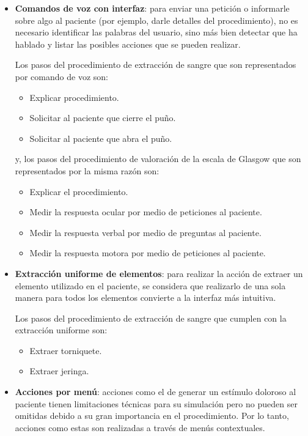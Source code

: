 \begin{itemize}
\item 
    \textbf{Comandos de voz con interfaz}:  para enviar una petición o informarle 
    sobre algo al paciente (por ejemplo, darle detalles del procedimiento), 
    no es necesario identificar las palabras del usuario, sino más bien detectar
    que ha hablado y listar las posibles acciones que se pueden realizar.
    
    Los pasos del procedimiento de extracción de sangre que son representados por 
    comando de voz son:
    
    \begin{itemize}
        \item Explicar procedimiento.
        \item Solicitar al paciente que cierre el puño.
        \item Solicitar al paciente que abra el puño.
    \end{itemize}
    
    y, los pasos del procedimiento de valoración de la escala de Glasgow 
    que son representados por la misma razón son:
    \begin{itemize}
        \item Explicar el procedimiento.
        \item Medir la respuesta ocular por medio de peticiones al paciente.
        \item Medir la respuesta verbal por medio de preguntas al paciente.
        \item Medir la respuesta motora por medio de peticiones al paciente.
    \end{itemize}

\item
    \textbf{Extracción uniforme de elementos}: para realizar la acción de extraer 
    un elemento utilizado en el paciente, se considera que realizarlo de una sola 
    manera para todos los elementos convierte a la interfaz más intuitiva.

    Los pasos del procedimiento de extracción de sangre que cumplen con la extracción 
    uniforme son:
    
    \begin{itemize}
        \item Extraer torniquete.
        \item Extraer jeringa.
    \end{itemize}
    
\item 
    \textbf{Acciones por menú}:  acciones como el de generar
    un estímulo doloroso al paciente tienen limitaciones técnicas para su
    simulación pero no pueden ser omitidas debido a su gran importancia en el
    procedimiento. Por lo tanto, acciones como estas son realizadas a través de
    menús contextuales.
    

\end{itemize}
